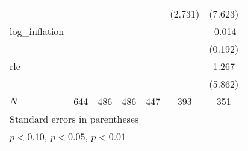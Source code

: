 {\begin{tabular}{l*{6}{c}}
            &                     &                     &                     &                     &     (2.731)         &     (7.623)         \\
\addlinespace
log\_inflation&                     &                     &                     &                     &                     &      -0.014         \\
            &                     &                     &                     &                     &                     &     (0.192)         \\
\addlinespace
rle         &                     &                     &                     &                     &                     &       1.267         \\
            &                     &                     &                     &                     &                     &     (5.862)         \\
\midrule
\(N\)       &         644         &         486         &         486         &         447         &         393         &         351         \\
\bottomrule
\multicolumn{7}{l}{\footnotesize Standard errors in parentheses}\\
\multicolumn{7}{l}{\footnotesize \sym{*} \(p<0.10\), \sym{**} \(p<0.05\), \sym{***} \(p<0.01\)}\\
\end{tabular}
}

